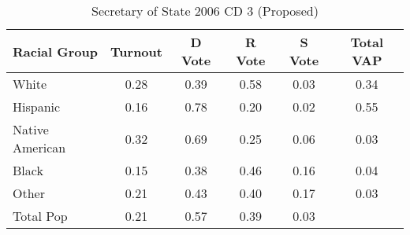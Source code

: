 \begin{table}[htb]
\begin{center}
\caption{Secretary of State 2006 CD 3 (Proposed)}
\label{sos06_vap_cd_3}
\begin{tabular}{lccccc}
  \hline
Racial Group & Turnout & D Vote & R Vote & S Vote & Total VAP \\ 
  \hline
White & 0.28 & 0.39 & 0.58 & 0.03 & 0.34 \\ 
  Hispanic & 0.16 & 0.78 & 0.20 & 0.02 & 0.55 \\ 
  Native American & 0.32 & 0.69 & 0.25 & 0.06 & 0.03 \\ 
  Black & 0.15 & 0.38 & 0.46 & 0.16 & 0.04 \\ 
  Other & 0.21 & 0.43 & 0.40 & 0.17 & 0.03 \\ 
  Total Pop & 0.21 & 0.57 & 0.39 & 0.03 &  \\ 
   \hline
\end{tabular}
\end{center}
\end{table}
